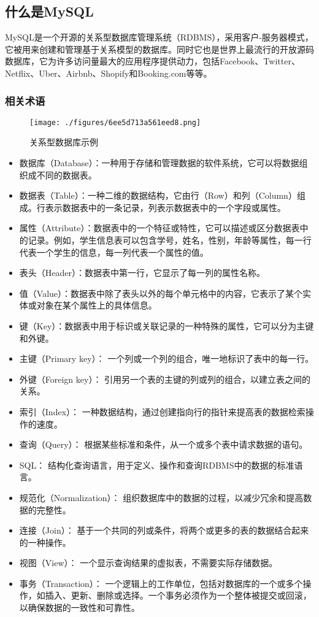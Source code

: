 
\subsection{什么是MySQL}

MySQL是一个开源的关系型数据库管理系统（RDBMS），采用客户-服务器模式，它被用来创建和管理基于关系模型的数据库。同时它也是世界上最流行的开放源码数据库，它为许多访问量最大的应用程序提供动力，包括Facebook、Twitter、Netflix、Uber、Airbnb、Shopify和Booking.com等等。

\subsubsection{相关术语}

\begin{figure}[ht]
\centering
\texttt{[image: ./figures/6ee5d713a561eed8.png]}
\caption{关系型数据库示例} \label{fig_MSQ001_2}
\end{figure}
\begin{itemize}
\item 数据库（Database）：一种用于存储和管理数据的软件系统，它可以将数据组织成不同的数据表。
\item 数据表（Table）：一种二维的数据结构，它由行（Row）和列（Column）组成。行表示数据表中的一条记录，列表示数据表中的一个字段或属性。
\item 属性（Attribute）：数据表中的一个特征或特性，它可以描述或区分数据表中的记录。例如，学生信息表可以包含学号，姓名，性别，年龄等属性，每一行代表一个学生的信息，每一列代表一个属性的值。
\item 表头（Header）：数据表中第一行，它显示了每一列的属性名称。
\item 值（Value）：数据表中除了表头以外的每个单元格中的内容，它表示了某个实体或对象在某个属性上的具体信息。
\item 键（Key）：数据表中用于标识或关联记录的一种特殊的属性，它可以分为主键和外键。
\item 主键（Primary key）： 一个列或一个列的组合，唯一地标识了表中的每一行。
\item 外键（Foreign key）： 引用另一个表的主键的列或列的组合，以建立表之间的关系。
\item 索引（Index）： 一种数据结构，通过创建指向行的指针来提高表的数据检索操作的速度。
\item 查询（Query）： 根据某些标准和条件，从一个或多个表中请求数据的语句。
\item SQL： 结构化查询语言，用于定义、操作和查询RDBMS中的数据的标准语言。
\item 规范化（Normalization）： 组织数据库中的数据的过程，以减少冗余和提高数据的完整性。
\item 连接（Join）： 基于一个共同的列或条件，将两个或更多的表的数据结合起来的一种操作。
\item 视图（View）： 一个显示查询结果的虚拟表，不需要实际存储数据。
\item 事务（Transaction）： 一个逻辑上的工作单位，包括对数据库的一个或多个操作，如插入、更新、删除或选择。一个事务必须作为一个整体被提交或回滚，以确保数据的一致性和可靠性。
\end{itemize}


